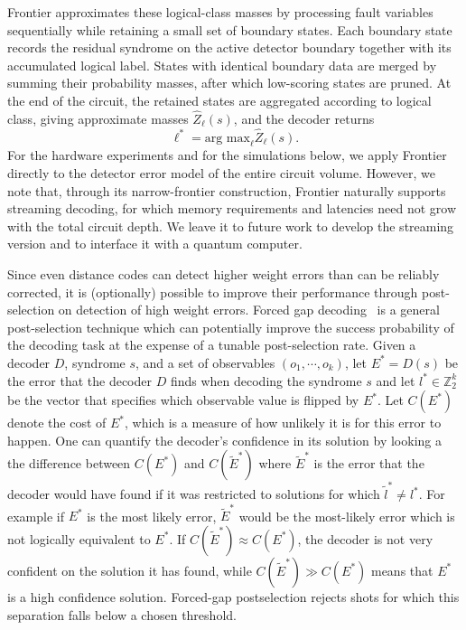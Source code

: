 Frontier approximates these logical-class masses by processing fault variables sequentially while retaining a small set of boundary states. Each boundary state records the residual syndrome on the active detector boundary together with its accumulated logical label. States with identical boundary data are merged by summing their probability masses, after which low-scoring states are pruned. At the end of the circuit, the retained states are aggregated according to logical class, giving approximate masses $\widehat{Z}_\ell(s)$, and the decoder returns
\begin{equation}
    \ell^*
    =
    \text{arg max}_\ell \widehat{Z}_\ell(s).
\end{equation}
For the hardware experiments and for the simulations below, we apply Frontier directly to the detector error model of the entire circuit volume. However, we note that, through its narrow-frontier construction, Frontier naturally supports streaming decoding, for which memory requirements and latencies need not grow with the total circuit depth. We leave it to future work to develop the streaming version and to interface it with a quantum computer.

Since even distance codes can detect higher weight errors than can be reliably corrected, it is (optionally) possible to improve their performance through post-selection on detection of high weight errors.
Forced gap decoding~\cite{gidney2023, lee2026, xie2026, wills2026} is a general post-selection technique which can potentially improve the success probability of the decoding task at the expense of a tunable post-selection rate. Given a decoder $D$, syndrome $s$, and a set of observables $(o_1,\cdots,o_k)$, let $E^*=D(s)$ be the error that the decoder $D$ finds when decoding the syndrome $s$ and let $l^*\in \mathbb{Z}_2^{k}$ be the vector that specifies which observable value is flipped by $E^*$. Let $C(E^*)$ denote the cost of $E^*$, which is a measure of how unlikely it is for this error to happen. One can quantify the decoder's confidence in its solution by looking a the difference between $C(E^*)$ and $C(\widetilde{E}^*)$ where $\widetilde{E}^*$ is the error that the decoder would have found if it was restricted to solutions for which $\widetilde{l}^*\ne l^*$. For example if $E^*$ is the most likely error, $\widetilde{E}^*$ would be the most-likely error which is not logically equivalent to $E^*$. If $C(\widetilde{E}^*) \approx C(E^*)$, the decoder is not very confident on the solution it has found, while $C(\widetilde{E}^*) \gg C(E^*)$ means that $E^*$ is a high confidence solution. Forced-gap postselection rejects shots for which this separation falls below a chosen threshold.

